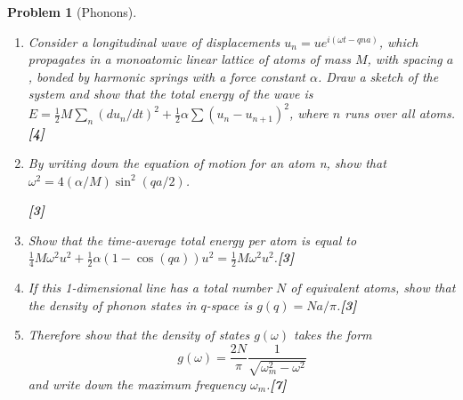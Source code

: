 \documentclass[a4paper]{article}
\theoremstyle{new}
\newtheorem{qns}{Problem}[subsection]
\begin{document}
\begin{qns}[Phonons]\leavevmode
\begin{enumerate}[label=(\roman*)]
\item Consider a longitudinal wave of displacements $u_n=ue^{i(\omega t-qna)}$, which propagates in a monoatomic linear lattice of atoms of mass $M$, with spacing $a$, bonded by harmonic springs with a force constant $\alpha$. Draw a sketch of the system and show that the total energy of the wave is $E=\frac{1}{2}M\sum_n(du_n/dt)^2+\frac{1}{2}\alpha\sum(u_n-u_{n+1})^2$, where $n$ runs over all atoms.\hfill\textbf{[4]}
\item By writing down the equation of motion for an atom n, show that $\omega^2=4(\alpha/M)\sin^2(qa/2)$.

\hfill\textbf{[3]}
\item Show that the time-average total energy per atom is equal to $\frac{1}{4}M\omega^2u^2+\frac{1}{2}\alpha(1-\cos(qa))u^2=\frac{1}{2}M\omega^2u^2$.\hfill\textbf{[3]}
\item If this 1-dimensional line has a total number $N$ of equivalent atoms, show that the density of phonon states in $q$-space is $g(q)=Na/\pi$.\hfill\textbf{[3]}
\item Therefore show that the density of states $g(\omega)$ takes the form
$$g(\omega)=\frac{2N}{\pi}\frac{1}{\sqrt{\omega_m^2-\omega^2}}$$
and write down the maximum frequency $\omega_m$.\hfill\textbf{[7]}
\end{enumerate}
\end{qns}
\end{document}
